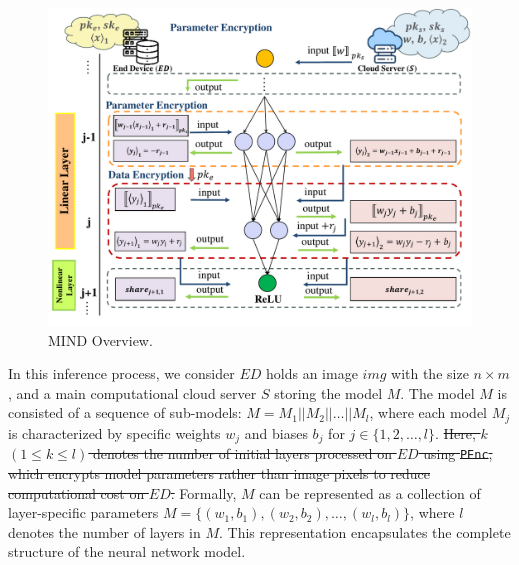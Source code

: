 ﻿\documentclass[conference]{IEEEtran}
\newcommand{\PEnc}{\texttt{PEnc}}
\providecommand{\DIFdeltex}[1]{{\protect\color{red}\sout{#1}}}                      %
\providecommand{\DIFdelbegin}{} %
\providecommand{\DIFdelend}{} %
\providecommand{\DIFdel}[1]{\texorpdfstring{\DIFdeltex{#1}}{}} %
\newcommand{\DIFscaledelfig}{0.5}
\newlength{\DIFdelgraphicswidth} %
\newlength{\DIFdelgraphicsheight} %
\newcommand{\DIFdelincludegraphics}[2][]{%
\sbox{\DIFdelgraphicsbox}{\DIFOincludegraphics[#1]{#2}}%
\settoboxwidth{\DIFdelgraphicswidth}{\DIFdelgraphicsbox} %
\settoboxtotalheight{\DIFdelgraphicsheight}{\DIFdelgraphicsbox} %
\scalebox{\DIFscaledelfig}{%
\parbox[b]{\DIFdelgraphicswidth}{\usebox{\DIFdelgraphicsbox}\\[-\baselineskip] \rule{\DIFdelgraphicswidth}{0em}}\llap{\resizebox{\DIFdelgraphicswidth}{\DIFdelgraphicsheight}{%
\setlength{\unitlength}{\DIFdelgraphicswidth}%
\begin{picture}(1,1)%
\thicklines\linethickness{2pt} %
{\color[rgb]{1,0,0}\put(0,0){\framebox(1,1){}}}%
{\color[rgb]{1,0,0}\put(0,0){\line( 1,1){1}}}%
{\color[rgb]{1,0,0}\put(0,1){\line(1,-1){1}}}%
\end{picture}%
}\hspace*{3pt}}} %
} %
\DeclareRobustCommand{\DIFdelbegin}{\DIFOdelbegin \let\includegraphics\DIFdelincludegraphics} %
\DeclareRobustCommand{\DIFdelend}{\DIFOaddend \let\includegraphics\DIFOincludegraphics} %
\begin{document}
\begin{figure}[ht]
\centering
\includegraphics[scale=0.6]{fig3.pdf}
\caption{MIND Overview.} \label{fig:MIND Overview}
\end{figure}
In this inference process, we consider $ED$ holds an image $img$ with the size $n\times m$, and a main computational cloud server $S$ storing the model $M$. The model $M$ is consisted of a sequence of sub-models: $M=M_1 || M_2 || \dots || M_l$, where each model $M_j$ is characterized by specific weights $w_{j}$ and biases $b_{j}$ for $j \in \{1, 2, \dots, l\}$. \DIFdelbegin \DIFdel{Here, $k$ $(1 \leq k \leq l)$ denotes the number of initial layers processed on $ED$ using \PEnc, which encrypts model parameters rather than image pixels to reduce computational cost on $ED$. }\DIFdelend Formally, $M$ can be represented as a collection of layer-specific parameters $M=\{(w_{1},b_{1}),(w_{2},b_{2}),\dots,(w_{l},b_{l})\}$, where $l$ denotes the number of layers in $M$. This representation encapsulates the complete structure of the neural network model.
\end{document}
